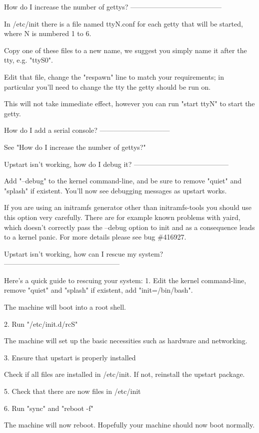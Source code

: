 \documentclass[mingoth,a4paper]{jsarticle}
\begin{document}
{{{{{{{How do I increase the number of gettys?
---------------------------------------

In /etc/init there is a file named ttyN.conf for each getty that will be
started, where N is numbered 1 to 6.

Copy one of these files to a new name, we suggest you simply name it
after the tty, e.g. "ttyS0".

Edit that file, change the "respawn" line to match your requirements;
in particular you'll need to change the tty the getty should be run
on.

This will not take immediate effect, however you can run "start ttyN"
to start the getty.


How do I add a serial console?
------------------------------

See "How do I increase the number of gettys?"


Upstart isn't working, how do I debug it?
-----------------------------------------

Add "--debug" to the kernel command-line, and be sure to remove "quiet"
and "splash" if existent.  You'll now see debugging messages as upstart
works.

If you are using an initramfs generator other than initramfs-tools you
should use this option very carefully. There are for example known
problems with yaird, which doesn't correctly pass the --debug option to
init and as a consequence leads to a kernel panic. For more details
please see bug \#416927.


Upstart isn't working, how can I rescue my system?
--------------------------------------------------

Here's a quick guide to rescuing your system:
 1. Edit the kernel command-line, remove "quiet" and "splash" if
    existent, add "init=/bin/bash".

    The machine will boot into a root shell.

 2. Run "/etc/init.d/rcS"

    The machine will set up the basic necessities such as hardware
    and networking.

 3. Ensure that upstart is properly installed

    Check if all files are installed in /etc/init. If not, reinstall the
    upstart package.

 5. Check that there are now files in /etc/init

 6. Run "sync" and "reboot -f"

    The machine will now reboot.
Hopefully your machine should now boot normally.


}}}}}}}
\end{document}

